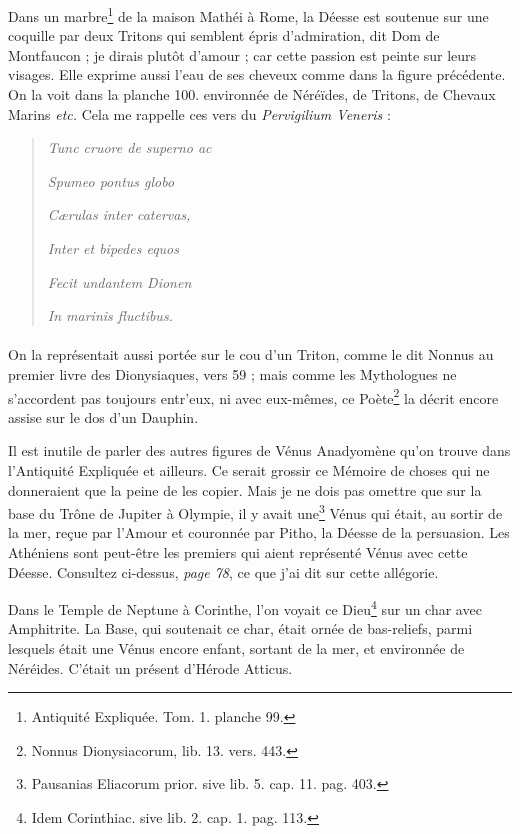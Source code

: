 \documentclass[a4paper, 11pt, oneside, polutonikogreek, french]{article}
\begin{document}
Dans un marbre\footnote{Antiquité Expliquée. Tom. 1. planche 99.} de la maison Mathéi à Rome, la Déesse est soutenue sur une coquille par deux Tritons qui semblent épris d'admiration, dit Dom de Montfaucon ; je dirais plutôt d'amour ; car cette passion est peinte sur leurs visages. Elle exprime aussi l'eau de ses cheveux comme dans la figure précédente. On la voit dans la planche 100. environnée de Néréïdes, de Tritons, de Chevaux Marins \emph{etc.} Cela me rappelle ces vers du \emph{Pervigilium Veneris} :
\begin{quotation}
\emph{Tunc cruore de superno ac}

\hspace*{5mm}\emph{Spumeo pontus globo}

\emph{Cærulas inter catervas,}

\hspace*{5mm}\emph{Inter et bipedes equos}

\emph{Fecit undantem Dionen}

\hspace*{5mm}\emph{In marinis fluctibus.}
\end{quotation}
\paragraph{}
On la représentait aussi portée sur le cou d'un Triton, comme le dit Nonnus au premier livre des Dionysiaques, vers 59 ; mais comme les Mythologues ne s'accordent pas toujours entr'eux, ni avec eux-mêmes, ce Poète\footnote{Nonnus Dionysiacorum, lib. 13. vers. 443.} la décrit encore assise sur le dos d'un Dauphin.

Il est inutile de parler des autres figures de Vénus Anadyomène qu'on trouve dans l'Antiquité Expliquée et ailleurs. Ce serait grossir ce Mémoire de choses qui ne donneraient que la peine de les copier. Mais je ne dois pas omettre que sur la base du Trône de Jupiter à Olympie, il y avait une\footnote{Pausanias Eliacorum prior. sive lib. 5. cap. 11. pag. 403.} Vénus qui était, au sortir de la mer, reçue par l'Amour et couronnée par Pitho, la Déesse de la persuasion. Les Athéniens sont peut-être les premiers qui aient représenté Vénus avec cette Déesse. Consultez ci-dessus, \emph{page 78}, ce que j'ai dit sur cette allégorie.

Dans le Temple de Neptune à Corinthe, l'on voyait ce Dieu\footnote{Idem Corinthiac. sive lib. 2. cap. 1. pag. 113.} sur un char avec Amphitrite. La Base, qui soutenait ce char, était ornée de bas-reliefs, parmi lesquels était une Vénus encore enfant, sortant de la mer, et environnée de Néréides. C'était un présent d'Hérode Atticus.
\end{document}
